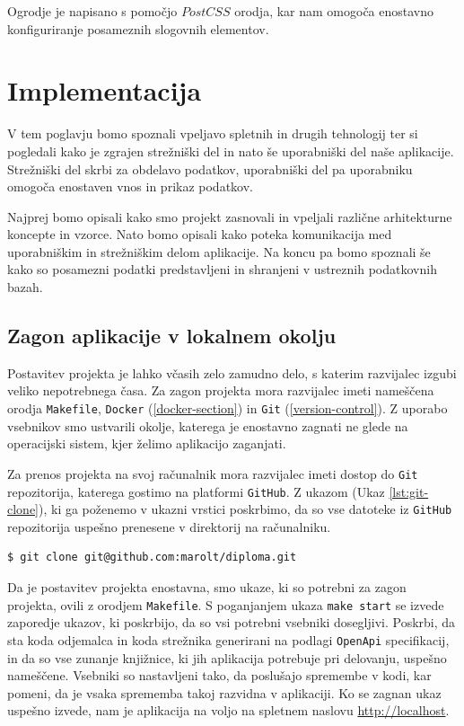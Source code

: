 \documentclass[a4paper, 12pt]{book}
\begin{document}
Ogrodje je napisano s pomočjo $PostCSS$ orodja, kar nam omogoča enostavno konfiguriranje posameznih slogovnih elementov.

\chapter{Implementacija}
V tem poglavju bomo spoznali vpeljavo spletnih in drugih tehnologij ter si pogledali kako je zgrajen strežniški del in nato še uporabniški del naše aplikacije. Strežniški del skrbi za obdelavo podatkov, uporabniški del pa uporabniku omogoča enostaven vnos in prikaz podatkov.

Najprej bomo opisali kako smo projekt zasnovali in vpeljali različne arhitekturne koncepte in vzorce. Nato bomo opisali kako poteka komunikacija med uporabniškim in strežniškim delom aplikacije. Na koncu pa bomo spoznali še kako so posamezni podatki predstavljeni in shranjeni v ustreznih podatkovnih bazah.

\section{Zagon aplikacije v lokalnem okolju}
Postavitev projekta je lahko včasih zelo zamudno delo, s katerim razvijalec izgubi veliko nepotrebnega časa. Za zagon projekta mora razvijalec imeti nameščena orodja \verb=Makefile=, \verb=Docker= (\ref{docker-section}) in \verb=Git= (\ref{version-control}). Z uporabo vsebnikov smo ustvarili okolje, katerega je enostavno zagnati ne glede na operacijski sistem, kjer želimo aplikacijo zaganjati.

Za prenos projekta na svoj računalnik mora razvijalec imeti dostop do \verb=Git= repozitorija, katerega gostimo na platformi \verb=GitHub=. Z ukazom (Ukaz \ref{lst:git-clone}), ki ga poženemo v ukazni vrstici poskrbimo, da so vse datoteke iz \verb=GitHub= repozitorija uspešno prenesene v direktorij na računalniku.

\begin{lstlisting}[language=bash,style=mystyle,caption={Ukaz za prenos datotek iz GitHub repozitorija.},label=lst:git-clone]
$ git clone git@github.com:marolt/diploma.git
\end{lstlisting}

Da je postavitev projekta enostavna, smo ukaze, ki so potrebni za zagon projekta, ovili z orodjem \verb=Makefile=. S poganjanjem ukaza \verb=make start= se izvede zaporedje ukazov, ki poskrbijo, da so vsi potrebni vsebniki dosegljivi. Poskrbi, da sta koda odjemalca in koda strežnika generirani na podlagi \verb=OpenApi= specifikacij, in da so vse zunanje knjižnice, ki jih aplikacija potrebuje pri delovanju, uspešno nameščene. Vsebniki so nastavljeni tako, da poslušajo spremembe v kodi, kar pomeni, da je vsaka sprememba takoj razvidna v aplikaciji. Ko se zagnan ukaz uspešno izvede, nam je aplikacija na voljo na spletnem naslovu \url{http://localhost}.
\end{document}
